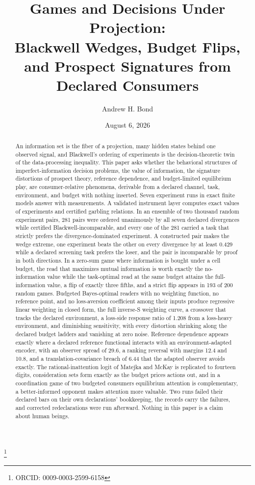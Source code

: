 \documentclass[aps,pre,reprint,nofootinbib]{revtex4-2}
\begin{document}
\title{Games and Decisions Under Projection:\\
Blackwell Wedges, Budget Flips, and Prospect Signatures from
Declared Consumers}

\author{Andrew H. Bond}
\thanks{ORCID: 0009-0003-2599-6158}
\date{August 6, 2026}

\begin{abstract}
An information set is the fiber of a projection, many hidden states
behind one observed signal, and Blackwell's ordering of experiments
is the decision-theoretic twin of the data-processing inequality.
This paper asks whether the behavioral structures of
imperfect-information decision problems, the value of information,
the signature distortions of prospect theory, reference dependence,
and budget-limited equilibrium play, are consumer-relative phenomena,
derivable from a declared channel, task, environment, and budget with
nothing inserted.  Seven experiment runs in exact finite models
answer with measurements.  A validated instrument layer computes
exact values of experiments and certified garbling relations.  In an
ensemble of two thousand random experiment pairs, 281 pairs were
ordered unanimously by all seven declared divergences while certified
Blackwell-incomparable, and every one of the 281 carried a task that
strictly prefers the divergence-dominated experiment.  A constructed
pair makes the wedge extreme, one experiment beats the other on every
divergence by at least 0.429 while a declared screening task prefers
the loser, and the pair is incomparable by proof in both directions.
In a zero-sum game where information is bought under a cell budget,
the read that maximizes mutual information is worth exactly the
no-information value while the task-optimal read at the same budget
attains the full-information value, a flip of exactly three fifths,
and a strict flip appears in 193 of 200 random games.  Budgeted
Bayes-optimal readers with no weighting function, no reference point,
and no loss-aversion coefficient among their inputs produce
regressive linear weighting in closed form, the full inverse-S
weighting curve, a crossover that tracks the declared environment, a
loss-side response ratio of 1.208 from a loss-heavy environment, and
diminishing sensitivity, with every distortion shrinking along the
declared budget ladders and vanishing at zero noise.  Reference
dependence appears exactly where a declared reference functional
interacts with an environment-adapted encoder, with an observer
spread of 29.6, a ranking reversal with margins 12.4 and 10.8, and a
translation-covariance breach of 6.44 that the adapted observer
avoids exactly.  The rational-inattention logit of Matejka and McKay
is replicated to fourteen digits, consideration sets form exactly as
the budget prices actions out, and in a coordination game of two
budgeted consumers equilibrium attention is complementary, a
better-informed opponent makes attention more valuable.  Two runs
failed their declared bars on their own declarations' bookkeeping,
the records carry the failures, and corrected redeclarations were run
afterward.  Nothing in this paper is a claim about human beings.
\end{abstract}
\end{document}
